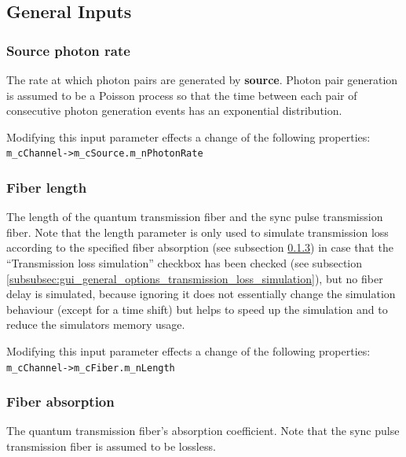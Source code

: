 \subsection{General Inputs}
\label{subsec:gui_general}

\subsubsection{Source photon rate}
The rate at which photon pairs are generated by \textbf{source}. Photon pair generation is assumed to be a Poisson process so that the time between each pair of consecutive photon generation events has an exponential distribution.

Modifying this input parameter effects a change of the following properties\hyperlink{fn:modinfo}{\footnotemark[\value{fnmodinfo}]}:\\
\texttt{m\_cChannel->m\_cSource.m\_nPhotonRate}


\subsubsection{Fiber length}
The length of the quantum transmission fiber and the sync pulse transmission fiber. Note that the length parameter is only used to simulate transmission loss according to the specified fiber absorption (see subsection \ref{subsubsec:gui_general_fiber_absorption}) in case that the ``Transmission loss simulation'' checkbox has been checked (see subsection \ref{subsubsec:gui_general_options_transmission_loss_simulation}), but no fiber delay is simulated, because ignoring it does not essentially change the simulation behaviour (except for a time shift) but helps to speed up the simulation and to reduce the simulators memory usage.

Modifying this input parameter effects a change of the following properties\hyperlink{fn:modinfo}{\footnotemark[\value{fnmodinfo}]}:\\
\texttt{m\_cChannel->m\_cFiber.m\_nLength}

\subsubsection{Fiber absorption}
\label{subsubsec:gui_general_fiber_absorption}
The quantum transmission fiber's absorption coefficient. Note that the sync pulse transmission fiber is assumed to be lossless.

